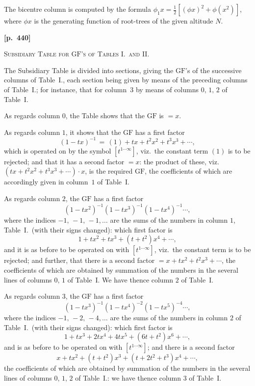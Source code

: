 \documentclass[11pt,a4paper]{article}
\providecommand{\GF}{\mathrm{GF}}
\begin{document}
The bicentre column is computed by the formula $\phi_{1}x=\tfrac{1}{2}[(\phi x)^{2}+\phi(x^{2})]$, where $\phi x$ is the generating function of root-trees of the given altitude $N$.

\newpage
\noindent\textbf{[p.~440]}\quad
\begin{center}
\textsc{Subsidiary Table for $\GF$'s of Tables I.\ and II.}
\end{center}

\noindent The Subsidiary Table is divided into sections, giving the $\GF$'s of the successive columns of Table~I., each section being given by means of the preceding columns of Table~I.; for instance, that for column~$3$ by means of columns $0,\,1,\,2$ of Table~I.

\medskip

\noindent As regards column $0$, the Table shows that the $\GF$ is $=x$.

\noindent As regards column $1$, it shows that the $\GF$ has a first factor
\[
(1-tx)^{-1}\,=\,(1)+tx+t^{2}x^{2}+t^{3}x^{3}+\cdots,
\]
which is operated on by the symbol $[t^{1\cdots\infty}]$, viz.\ the constant term $(1)$ is to be rejected; and that it has a second factor $=x$: the product of these, viz.\ $(tx+t^{2}x^{2}+t^{3}x^{3}+\cdots)\cdot x$, is the required $\GF$, the coefficients of which are accordingly given in column~$1$ of Table~I.

\noindent As regards column $2$, the $\GF$ has a first factor
\[
(1-tx^{2})^{-1}(1-tx^{3})^{-1}(1-tx^{4})^{-1}\cdots,
\]
where the indices $-1,\,-1,\,-1,\ldots$ are the sums of the numbers in column $1$, Table~I.\ (with their signs changed): which first factor is
\[
1 + tx^{2} + tx^{3} + (t+t^{2})x^{4} + \cdots,
\]
and it is as before to be operated on with $[t^{1\cdots\infty}]$, viz.\ the constant term is to be rejected; and further, that there is a second factor $=x+tx^{2}+t^{2}x^{3}+\cdots$, the coefficients of which are obtained by summation of the numbers in the several lines of columns $0,\,1$ of Table~I. We have thence column $2$ of Table~I.

\noindent As regards column $3$, the $\GF$ has a first factor
\[
(1-tx^{3})^{-1}(1-tx^{4})^{-2}(1-tx^{5})^{-4}\cdots,
\]
where the indices $-1,\,-2,\,-4,\ldots$ are the sums of the numbers in column $2$ of Table~I.\ (with their signs changed): which first factor is
\[
1 + tx^{3} + 2tx^{4} + 4tx^{5} + (6t+t^{2})x^{6} + \cdots,
\]
and is as before to be operated on with $[t^{1\cdots\infty}]$; and there is a second factor
\[
x + tx^{2} + (t+t^{2})x^{3} + (t+2t^{2}+t^{3})x^{4} + \cdots,
\]
the coefficients of which are obtained by summation of the numbers in the several lines of columns $0,\,1,\,2$ of Table~I.: we have thence column $3$ of Table~I.
\end{document}
